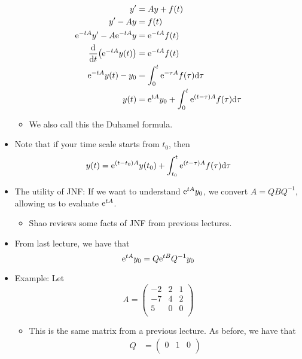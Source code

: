 \documentclass[../notes.tex]{subfiles}
\begin{document}
\begin{itemize}
    \begin{align*}
        y' &= Ay+f(t)\\
        y'-Ay &= f(t)\\
        \e[-tA]y'-A\e[-tA]y &= \e[-tA]f(t)\\
        \dv{t}(\e[-tA]y(t)) &= \e[-tA]f(t)\\
        \e[-tA]y(t)-y_0 &= \int_0^t\e[-\tau A]f(\tau)\dd\tau\\
        y(t) &= \e[tA]y_0+\int_0^t\e[(t-\tau)A]f(\tau)\dd\tau
    \end{align*}
    \begin{itemize}
        \item We also call this the Duhamel formula.
    \end{itemize}
    \item Note that if your time scale starts from $t_0$, then
    \begin{equation*}
        y(t) = \e[(t-t_0)A]y(t_0)+\int_{t_0}^t\e[(t-\tau)A]f(\tau)\dd\tau
    \end{equation*}
    \item The utility of JNF: If we want to understand $\e[tA]y_0$, we convert $A=QBQ^{-1}$, allowing us to evaluate $\e[tA]$.
    \begin{itemize}
        \item Shao reviews some facts of JNF from previous lectures.
    \end{itemize}
    \item From last lecture, we have that
    \begin{equation*}
        \e[tA]y_0 = Q\e[tB]Q^{-1}y_0
    \end{equation*}
    \item Example: Let
    \begin{equation*}
        A =
        \begin{pmatrix}
            -2 & 2 & 1\\
            -7 & 4 & 2\\
            5 & 0 & 0\\
        \end{pmatrix}
    \end{equation*}
    \begin{itemize}
        \item This is the same matrix from a previous lecture. As before, we have that
        \begin{align*}
            Q &=
            \begin{pmatrix}
                0 & 1 & 0\\

\end{pmatrix}
\end{align*}
\end{itemize}
\end{itemize}
\end{document}
